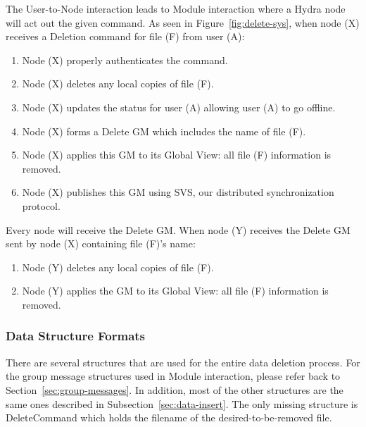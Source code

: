 The User-to-Node interaction leads to Module interaction where a Hydra node will act out the given command. As seen in Figure~\ref{fig:delete-sys}, when node (X) receives a Deletion command for file (F) from user (A):
\begin{enumerate}
    \item Node (X) properly authenticates the command.
    \item Node (X) deletes any local copies of file (F).
    \item Node (X) updates the status for user (A) allowing user (A) to go offline.
    \item Node (X) forms a Delete GM which includes the name of file (F).
    \item Node (X) applies this GM to its Global View: all file (F) information is removed.
    \item Node (X) publishes this GM using SVS, our distributed synchronization protocol.
\end{enumerate}

Every node will receive the Delete GM. When node (Y) receives the Delete GM sent by node (X) containing file (F)'s name:
\begin{enumerate}
    \item Node (Y) deletes any local copies of file (F).
    \item Node (Y) applies the GM to its Global View: all file (F) information is removed.
\end{enumerate}


\subsubsection{Data Structure Formats} 
There are several structures that are used for the entire data deletion process. For the group message structures used in Module interaction, please refer back to Section~\ref{sec:group-messages}. In addition, most of the other structures are the same ones described in Subsection~\ref{sec:data-insert}. The only missing structure is DeleteCommand which holds the filename of the desired-to-be-removed file.